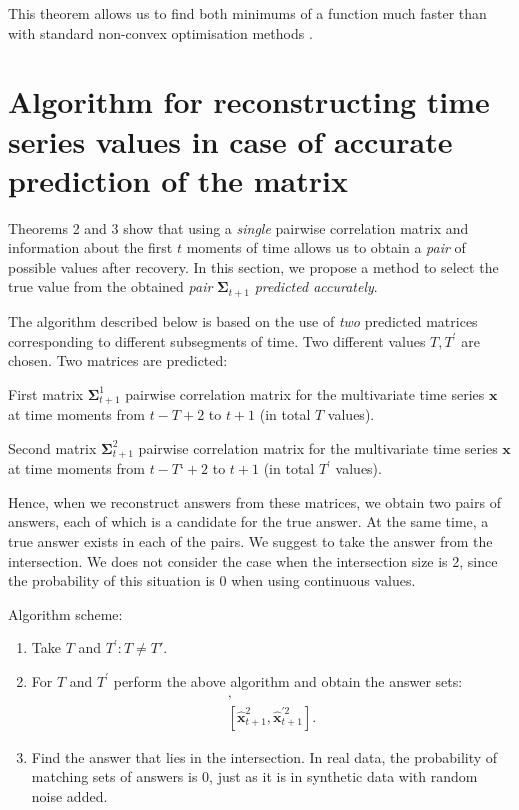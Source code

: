 \documentclass{article}
\begin{document}
{This theorem allows us to find both minimums of a function much faster than with standard non-convex optimisation methods \cite{mikhalevich2024methodsnonconvexoptimization}.

\section{Algorithm for reconstructing time series values in case of accurate prediction of the matrix}

Theorems 2 and 3 show that using a \textit{single} pairwise correlation matrix and information about the first $t$ moments of time allows us to obtain a \textit{pair} of possible values after recovery. In this section, we propose a method to select the true value from the obtained \textit{pair} $\mathbf{\Sigma}_{t+1}$ \textit{predicted accurately}.

The algorithm described below is based on the use of \textit{two} predicted matrices corresponding to different subsegments of time. Two different values $T, T^\prime$ are chosen. Two matrices are predicted:

First matrix $\mathbf{\Sigma}_{t+1}^1$ pairwise correlation matrix for the multivariate time series $\mathbf{x}$ at time moments from $t-T+2$ to $t+1$ (in total $T$ values).

Second matrix $\mathbf{\Sigma}_{t+1}^2$ pairwise correlation matrix for the multivariate time series $\mathbf{x}$ at time moments from $t-T‘+2$ to $t+1$ (in total $T^\prime$ values).

Hence, when we reconstruct answers from these matrices, we obtain two pairs of answers, each of which is a candidate for the true answer. At the same time, a true answer exists in each of the pairs. We suggest to take the answer from the intersection. We does not consider the case when the intersection size is 2, since the probability of this situation is 0 when using continuous values.

Algorithm scheme:

\begin{enumerate}
	\item Take $T$ and $T^\prime: T \neq T'$.
	\item For $T$ and $T^\prime$ perform the above algorithm and obtain the answer sets: 
	\begin{gather*}
	 [\hat{\mathbf{x}}_{t+1}^1, \hat{\mathbf{x}}^{\prime 1}_{t+1}],\\ [\hat{\mathbf{x}}_{t+1}^2, \hat{\mathbf{x}}^{\prime 2}_{t+1}].
	 \end{gather*}
	\item Find the answer that lies in the intersection.
	In real data, the probability of matching sets of answers is 0, just as it is in synthetic data with random noise added.
\end{enumerate}


}
\end{document}
